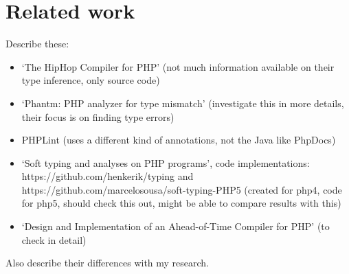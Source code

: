 \documentclass[../main.tex]{subfiles}
\begin{document}
    \section{Related work}\label{sec:background_related-work}
    Describe these:
    \begin{itemize}
        \item `The HipHop Compiler for PHP'\cite{Zhao:12} (not much information available on their type inference, only source code)
        \item `Phantm: PHP analyzer for type mismatch'\cite{Kne:10,Bar:10} (investigate this in more details, their focus is on finding type errors)
        \item PHPLint \footnotemark (uses a different kind of annotations, not the Java like PhpDocs)
        \item `Soft typing and analyses on PHP programs'\cite{}, code implementations: https://github.com/henkerik/typing and https://github.com/marcelosousa/soft-typing-PHP5 (created for php4, code for php5, should check this out, might be able to compare results with this)
        \item `Design and Implementation of an Ahead-of-Time Compiler for PHP'\cite{Big:10} (to check in detail)
    \end{itemize}
    Also describe their differences with my research.
    
\end{document}
